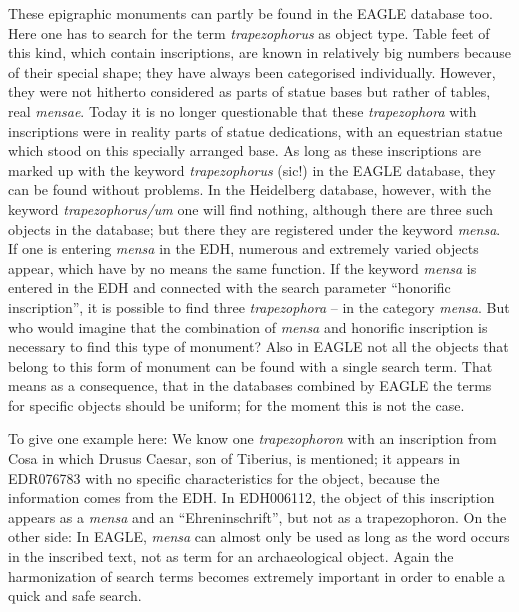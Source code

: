 \documentclass{article}
\begin{document}
These epigraphic monuments can partly be found in the EAGLE database too. Here 
one has to search for the term \textit{trapezophorus }as object type. Table feet 
of this kind, which contain inscriptions, are known in relatively big numbers because 
of their special shape; they have always been categorised individually. However, 
they were not hitherto considered as parts of statue bases but rather of tables, 
real \textit{mensae}. Today it is no longer questionable that these \textit{trapezophora 
}with inscriptions were in reality parts of statue dedications, with an equestrian 
statue which stood on this specially arranged base. As long as these inscriptions 
are marked up with the keyword \textit{trapezophorus }(sic!) in the EAGLE database, 
they can be found without problems. In the Heidelberg database, however, with the 
keyword \textit{trapezophorus/um} one will find nothing, although there are three 
such objects in the database; but there they are\textit{ }registered under the 
keyword \textit{mensa}. If one is entering \textit{mensa }in the EDH, numerous 
and extremely varied objects appear, which have by no means the same function. 
If the keyword \textit{mensa }is entered in the EDH and connected with the search 
parameter ``honorific inscription'', it is possible to find three \textit{trapezophora} 
– in the category \textit{mensa}. But who would imagine that the combination 
of \textit{mensa} and honorific inscription is necessary to find this type of monument? 
Also in EAGLE not all the objects that belong to this form of monument can be found 
with a single search term. That means as a consequence, that in the databases combined 
by EAGLE the terms for specific objects should be uniform; for the moment this 
is not the case. 

To give one example here: We know one \textit{trapezophoron } with an inscription 
from Cosa in which Drusus Caesar, son of Tiberius, is mentioned; it appears in 
EDR076783 with no specific characteristics for the object, because the information 
comes from the EDH. In EDH006112, the object of this inscription appears as a \textit{mensa} 
and an ``Ehreninschrift'', but not as a trapezophoron. On the other side: In EAGLE, 
\textit{mensa }can almost only be used as long as the word occurs in the inscribed 
text, not as term for an archaeological object. Again the harmonization of search 
terms becomes extremely important in order to enable a quick and safe search.  
\end{document}
